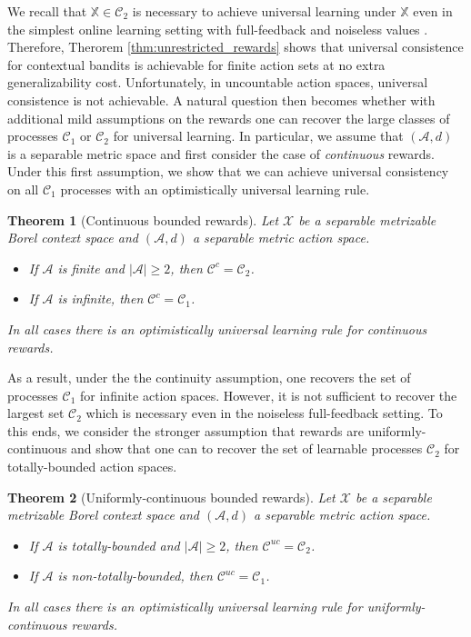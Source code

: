 \documentclass[aos]{imsart}
\theoremstyle{plain}
\newtheorem{theorem}{Theorem}[section]
\theoremstyle{remark}
\newcommand{\Acal}{\mathcal{A}}
\newcommand{\Ccal}{\mathcal{C}}
\newcommand{\Xcal}{\mathcal{X}}
\newcommand{\Xbb}{\mathbb{X}}
\newcommand{\1}{\mathbbm{1}}%
\begin{document}
We recall that $\Xbb\in \Ccal_2$ is necessary to achieve universal learning under $\Xbb$ even in the simplest online learning setting with full-feedback and noiseless values \cite{hanneke:21,blanchard:22a}. Therefore, Therorem \ref{thm:unrestricted_rewards} shows that universal consistence for contextual bandits is achievable for finite action sets at no extra generalizability cost. Unfortunately, in uncountable action spaces, universal consistence is not achievable. A natural question then becomes whether with additional mild assumptions on the rewards one can recover the large classes of processes $\Ccal_1$ or $\Ccal_2$ for universal learning. In particular, we assume that $(\Acal,d)$ is a separable metric space and first consider the case of \emph{continuous} rewards. Under this first assumption, we show that we can achieve universal consistency on all $\Ccal_1$ processes with an optimistically universal learning rule.

\begin{theorem}[Continuous bounded rewards]\label{thm:continuous_rewards}
    Let $\Xcal$ be a separable metrizable Borel context space and $(\Acal,d)$ a separable metric action space.
    \begin{itemize}
        \item If $\Acal$ is finite and $|\Acal|\geq 2$, then $\Ccal^c = \Ccal_2$.
        \item If $\Acal$ is infinite, then $\Ccal^c = \Ccal_1$.
    \end{itemize}
    In all cases there is an optimistically universal learning rule for continuous rewards.
\end{theorem}

As a result, under the the continuity assumption, one recovers the set of processes $\Ccal_1$ for infinite action spaces. However, it is not sufficient to recover the largest set $\Ccal_2$ which is necessary even in the noiseless full-feedback setting. To this ends, we consider the stronger assumption that rewards are uniformly-continuous and show that one can to recover the set of learnable processes $\Ccal_2$ for totally-bounded action spaces.

\begin{theorem}[Uniformly-continuous bounded rewards]\label{thm:uniformly_continuous_rewards}
    Let $\Xcal$ be a separable metrizable Borel context space and $(\Acal,d)$ a separable metric action space.
    \begin{itemize}
        \item If $\Acal$ is totally-bounded and $|\Acal|\geq 2$, then $\Ccal^{uc} = \Ccal_2$.
        \item If $\Acal$ is non-totally-bounded, then $\Ccal^{uc} = \Ccal_1$.
    \end{itemize}
    In all cases there is an optimistically universal learning rule for uniformly-continuous rewards.
\end{theorem}
\end{document}
